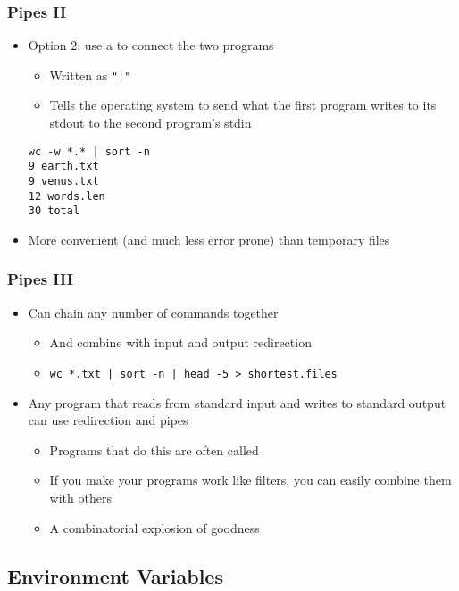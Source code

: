 \begin{frame}[fragile]\frametitle{Pipes II}
\begin{itemize}
\item Option 2: use a  to connect the two programs
\begin{itemize}
    \item Written as \lstinline!"|"!
    \item Tells the operating system to send what the first program writes to its stdout to the second program's stdin
\end{itemize}
\codelist
\begin{lstlisting}[linewidth=5cm]
wc -w *.* | sort -n
9 earth.txt
9 venus.txt
12 words.len
30 total
\end{lstlisting}
\item More convenient (and much less error prone) than temporary files
\end{itemize}
\end{frame}

\begin{frame}[fragile]\frametitle{Pipes III}
\begin{itemize}
\item Can chain any number of commands together
\begin{itemize}
    \item And combine with input and output redirection
    \item \codelist \codesmall 
\begin{lstlisting}[linewidth=7cm]
      wc *.txt | sort -n | head -5 > shortest.files
\end{lstlisting}
\end{itemize}
\item Any program that reads from standard input and writes to standard output can use redirection and pipes
\begin{itemize}
    \item Programs that do this are often called 
    \item If you make your programs work like filters, you can easily combine them with others
    \item A combinatorial explosion of goodness
\end{itemize}
\end{itemize}
\end{frame}

\subsection{Environment Variables}


